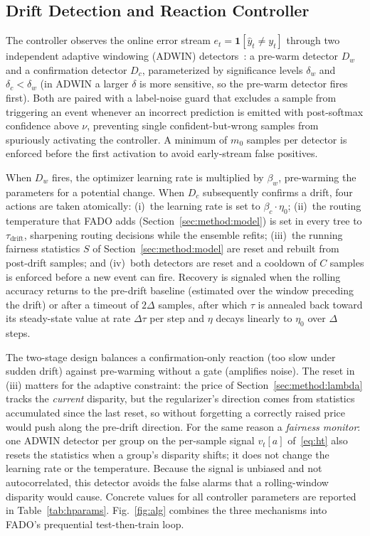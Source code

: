 \documentclass[conference]{IEEEtran}
\newcommand{\fado}{\textsc{FADO}}
\begin{document}
\subsection{Drift Detection and Reaction Controller}
\label{sec:method:drift}
The controller observes the online error stream $e_t = \mathbf{1}[\hat{y}_t \neq y_t]$ 
through two independent adaptive windowing (ADWIN)
detectors~\cite{doi:10.1137/1.9781611972771.42}: a pre-warm detector $D_w$ and a confirmation 
detector $D_c$, parameterized by significance levels $\delta_w$ and
$\delta_c<\delta_w$ (in ADWIN a larger $\delta$ is more sensitive, so the pre-warm 
detector fires first). Both are paired with a label-noise guard that excludes a
sample from triggering an event whenever an incorrect prediction is emitted with 
post-softmax confidence above $\nu$, preventing single confident-but-wrong samples
from spuriously activating the controller. A minimum of $m_0$ samples per detector 
is enforced before the first activation to avoid early-stream false positives.

When $D_w$ fires, the optimizer learning rate is multiplied by $\beta_w$, pre-warming the 
parameters for a potential change. When $D_c$ subsequently confirms a
drift, four actions are taken atomically: (i)~the learning rate is set to 
$\beta_c \cdot \eta_0$; (ii)~the routing temperature that \fado{} adds 
(Section~\ref{sec:method:model}) is set in every tree to
$\tau_{\mathrm{drift}}$, sharpening routing decisions while the ensemble refits; 
(iii)~the running fairness statistics $S$ of Section~\ref{sec:method:model} are
reset and rebuilt from post-drift samples; and (iv)~both detectors are reset and 
a cooldown of $C$ samples is enforced before a new event can fire. Recovery is
signaled when the rolling accuracy returns to the pre-drift baseline 
(estimated over the window preceding the drift) or after a timeout of $2\Delta$ samples,
after which $\tau$ is annealed back toward its steady-state value at rate $\Delta\tau$ 
per step and $\eta$ decays linearly to $\eta_0$ over $\Delta$ steps.

The two-stage design balances a confirmation-only reaction (too slow under sudden drift) 
against pre-warming without a gate (amplifies noise). The reset in
(iii) matters for the adaptive constraint: the price of Section~\ref{sec:method:lambda} 
tracks the \emph{current} disparity, but the regularizer's direction comes
from statistics accumulated since the last reset, so without forgetting a correctly 
raised price would push along the pre-drift direction. For the same reason a
\emph{fairness monitor}: one ADWIN detector per group on the per-sample signal 
$v_t[a]$ of~\eqref{eq:ht} also resets the statistics when a group's disparity
shifts; it does not change the learning rate or the temperature. Because the signal 
is unbiased and not autocorrelated, this detector avoids the false alarms that a
rolling-window disparity would cause. Concrete values for all controller parameters 
are reported in Table~\ref{tab:hparams}. Fig.~\ref{fig:alg} combines the three mechanisms into \fado{}'s prequential
test-then-train loop.
\end{document}
